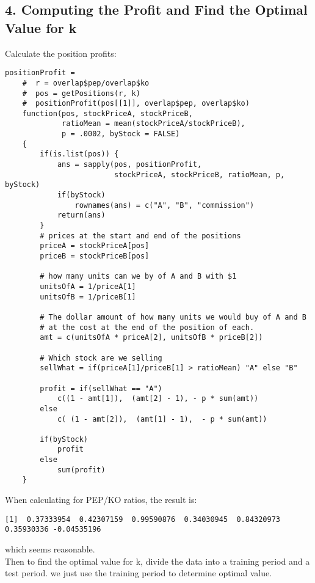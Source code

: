 \documentclass{article}
\begin{document}
\subsection*{4. Computing the Profit and Find the Optimal Value for k}
Calculate the position profits: 
\begin{verbatim}
positionProfit =
    #  r = overlap$pep/overlap$ko
    #  pos = getPositions(r, k)
    #  positionProfit(pos[[1]], overlap$pep, overlap$ko)
    function(pos, stockPriceA, stockPriceB, 
             ratioMean = mean(stockPriceA/stockPriceB), 
             p = .0002, byStock = FALSE)
    {
        if(is.list(pos)) {
            ans = sapply(pos, positionProfit, 
                         stockPriceA, stockPriceB, ratioMean, p, byStock)
            if(byStock)
                rownames(ans) = c("A", "B", "commission")
            return(ans)
        }
        # prices at the start and end of the positions
        priceA = stockPriceA[pos]
        priceB = stockPriceB[pos]
        
        # how many units can we by of A and B with $1
        unitsOfA = 1/priceA[1]
        unitsOfB = 1/priceB[1]
        
        # The dollar amount of how many units we would buy of A and B
        # at the cost at the end of the position of each.
        amt = c(unitsOfA * priceA[2], unitsOfB * priceB[2])
        
        # Which stock are we selling
        sellWhat = if(priceA[1]/priceB[1] > ratioMean) "A" else "B"
        
        profit = if(sellWhat == "A") 
            c((1 - amt[1]),  (amt[2] - 1), - p * sum(amt))
        else 
            c( (1 - amt[2]),  (amt[1] - 1),  - p * sum(amt))
        
        if(byStock)
            profit
        else
            sum(profit)
    }
\end{verbatim}
When calculating for PEP/KO ratios, the result is: 
\begin{verbatim}
[1]  0.37333954  0.42307159  0.99590876  0.34030945  0.84320973  0.35930336 -0.04535196
\end{verbatim}
which seems reasonable.\\
Then to find the optimal value for k, divide the data into a training period and a test period. we just use the training period to determine optimal value. 
\end{document}
